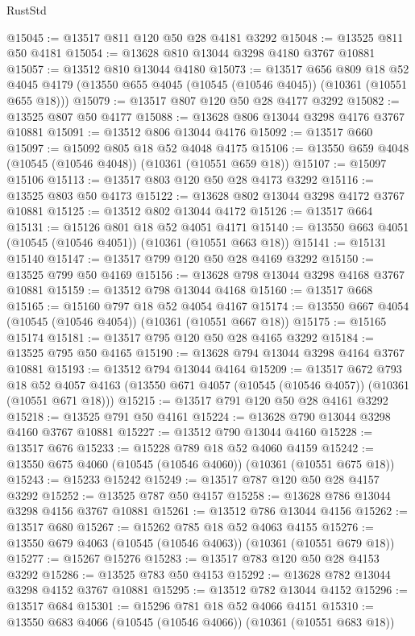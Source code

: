 \begin{lexlean}{RustStd}
\begin{coremodule}
@15045 := @13517 @811 @120 @50 @28 @4181 @3292
@15048 := @13525 @811 @50 @4181
@15054 := @13628 @810 @13044 @3298 @4180 @3767 @10881
@15057 := @13512 @810 @13044 @4180
@15073 := @13517
    @656
    @809
    @18
    @52
    @4045
    @4179
    (@13550 @655 @4045 (@10545 (@10546 @4045)) (@10361 (@10551 @655 @18)))
@15079 := @13517 @807 @120 @50 @28 @4177 @3292
@15082 := @13525 @807 @50 @4177
@15088 := @13628 @806 @13044 @3298 @4176 @3767 @10881
@15091 := @13512 @806 @13044 @4176
@15092 := @13517 @660
@15097 := @15092 @805 @18 @52 @4048 @4175
@15106 := @13550 @659 @4048 (@10545 (@10546 @4048)) (@10361 (@10551 @659 @18))
@15107 := @15097 @15106
@15113 := @13517 @803 @120 @50 @28 @4173 @3292
@15116 := @13525 @803 @50 @4173
@15122 := @13628 @802 @13044 @3298 @4172 @3767 @10881
@15125 := @13512 @802 @13044 @4172
@15126 := @13517 @664
@15131 := @15126 @801 @18 @52 @4051 @4171
@15140 := @13550 @663 @4051 (@10545 (@10546 @4051)) (@10361 (@10551 @663 @18))
@15141 := @15131 @15140
@15147 := @13517 @799 @120 @50 @28 @4169 @3292
@15150 := @13525 @799 @50 @4169
@15156 := @13628 @798 @13044 @3298 @4168 @3767 @10881
@15159 := @13512 @798 @13044 @4168
@15160 := @13517 @668
@15165 := @15160 @797 @18 @52 @4054 @4167
@15174 := @13550 @667 @4054 (@10545 (@10546 @4054)) (@10361 (@10551 @667 @18))
@15175 := @15165 @15174
@15181 := @13517 @795 @120 @50 @28 @4165 @3292
@15184 := @13525 @795 @50 @4165
@15190 := @13628 @794 @13044 @3298 @4164 @3767 @10881
@15193 := @13512 @794 @13044 @4164
@15209 := @13517
    @672
    @793
    @18
    @52
    @4057
    @4163
    (@13550 @671 @4057 (@10545 (@10546 @4057)) (@10361 (@10551 @671 @18)))
@15215 := @13517 @791 @120 @50 @28 @4161 @3292
@15218 := @13525 @791 @50 @4161
@15224 := @13628 @790 @13044 @3298 @4160 @3767 @10881
@15227 := @13512 @790 @13044 @4160
@15228 := @13517 @676
@15233 := @15228 @789 @18 @52 @4060 @4159
@15242 := @13550 @675 @4060 (@10545 (@10546 @4060)) (@10361 (@10551 @675 @18))
@15243 := @15233 @15242
@15249 := @13517 @787 @120 @50 @28 @4157 @3292
@15252 := @13525 @787 @50 @4157
@15258 := @13628 @786 @13044 @3298 @4156 @3767 @10881
@15261 := @13512 @786 @13044 @4156
@15262 := @13517 @680
@15267 := @15262 @785 @18 @52 @4063 @4155
@15276 := @13550 @679 @4063 (@10545 (@10546 @4063)) (@10361 (@10551 @679 @18))
@15277 := @15267 @15276
@15283 := @13517 @783 @120 @50 @28 @4153 @3292
@15286 := @13525 @783 @50 @4153
@15292 := @13628 @782 @13044 @3298 @4152 @3767 @10881
@15295 := @13512 @782 @13044 @4152
@15296 := @13517 @684
@15301 := @15296 @781 @18 @52 @4066 @4151
@15310 := @13550 @683 @4066 (@10545 (@10546 @4066)) (@10361 (@10551 @683 @18))

\end{coremodule}
\end{lexlean}
